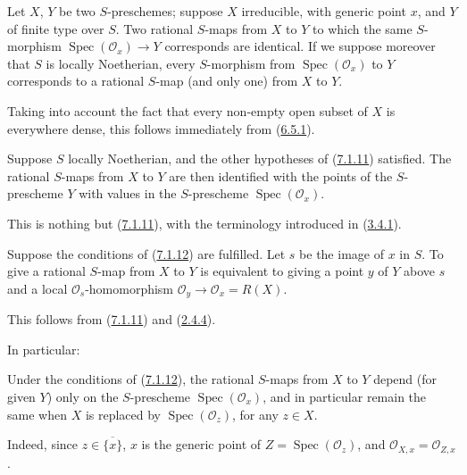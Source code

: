 \begin{proposition}[7.1.11]
\label{I.7.1.11}
Let $X$, $Y$ be two $S$-preschemes; suppose $X$ irreducible, with generic
point $x$, and $Y$ of finite type over $S$. Two rational $S$-maps from $X$ to
$Y$ to which the same $S$-morphism $\operatorname{Spec}(\mathscr{O}_x)\to Y$
corresponds are identical. If we suppose moreover that $S$ is locally
Noetherian, every $S$-morphism from $\operatorname{Spec}(\mathscr{O}_x)$ to
$Y$ corresponds to a rational $S$-map (and only one) from $X$ to $Y$.
\end{proposition}

Taking into account the fact that every non-empty open subset of $X$ is
everywhere dense, this follows immediately from
(\hyperref[I.6.5.1]{6.5.1}).

\begin{corollary}[7.1.12]
\label{I.7.1.12}
Suppose $S$ locally Noetherian, and the other hypotheses of
(\hyperref[I.7.1.11]{7.1.11}) satisfied. The rational $S$-maps from $X$ to
$Y$ are then identified with the points of the $S$-prescheme $Y$ with values
in the $S$-prescheme $\operatorname{Spec}(\mathscr{O}_x)$.
\end{corollary}

This is nothing but (\hyperref[I.7.1.11]{7.1.11}), with the terminology
introduced in (\hyperref[I.3.4.1]{3.4.1}).

\begin{corollary}[7.1.13]
\label{I.7.1.13}
Suppose the conditions of (\hyperref[I.7.1.12]{7.1.12}) are fulfilled. Let
$s$ be the image of $x$ in $S$. To give a rational $S$-map from $X$ to $Y$ is
equivalent to giving a point $y$ of $Y$ above $s$ and a local
$\mathscr{O}_s$-homomorphism
$\mathscr{O}_y\to\mathscr{O}_x=R(X)$.
\end{corollary}

This follows from (\hyperref[I.7.1.11]{7.1.11}) and
(\hyperref[I.2.4.4]{2.4.4}).

In particular:

\begin{corollary}[7.1.14]
\label{I.7.1.14}
Under the conditions of (\hyperref[I.7.1.12]{7.1.12}), the rational
$S$-maps from $X$ to $Y$ depend (for given $Y$) only on the
$S$-prescheme $\operatorname{Spec}(\mathscr{O}_x)$, and in particular remain
the same when $X$ is replaced by
$\operatorname{Spec}(\mathscr{O}_z)$, for any $z\in X$.
\end{corollary}

Indeed, since $z\in\overline{\{x\}}$, $x$ is the generic point of
$Z=\operatorname{Spec}(\mathscr{O}_z)$, and
$\mathscr{O}_{X,x}=\mathscr{O}_{Z,x}$.

